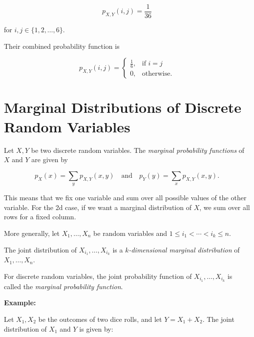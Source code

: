 \[
    p_{X,Y}(i, j) = \frac{1}{36}
\]

for \( i, j \in \{1, 2, \ldots, 6\} \).

Their combined probability function is

\[
    p_{X,Y}(i, j) =
    \begin{cases}
        \frac{1}{6}, & \text{if } i = j \\
        0, & \text{otherwise.}
    \end{cases}
\]

\section{Marginal Distributions of Discrete Random Variables}

Let \( X, Y \) be two discrete random variables.
The \emph{marginal probability functions} of \( X \) and \( Y \) are given by

\[
    p_X(x) = \sum_{y} p_{X,Y}(x, y) \quad \text{and} \quad p_Y(y) = \sum_{x} p_{X,Y}(x, y).
\]

This means that we fix one variable and sum over all possible values of the other variable. For the 2d case, 
if we want a marginal distribution of \(X\), we sum over all rows for a fixed column.

More generally, let \( X_1, \ldots, X_n \) be random variables and \( 1 \leq i_1 < \cdots < i_k \leq n \).

The joint distribution of \( X_{i_1}, \ldots, X_{i_k} \) is a \emph{\(k\)-dimensional marginal distribution} of \( X_1, \ldots, X_n \).

For discrete random variables, the joint probability function of \( X_{i_1}, \ldots, X_{i_k} \) is called the \emph{marginal probability function}.

\textbf{Example:}

Let \( X_1, X_2 \) be the outcomes of two dice rolls, and let \( Y = X_1 + X_2 \).
The joint distribution of \( X_1 \) and \( Y \) is given by:

